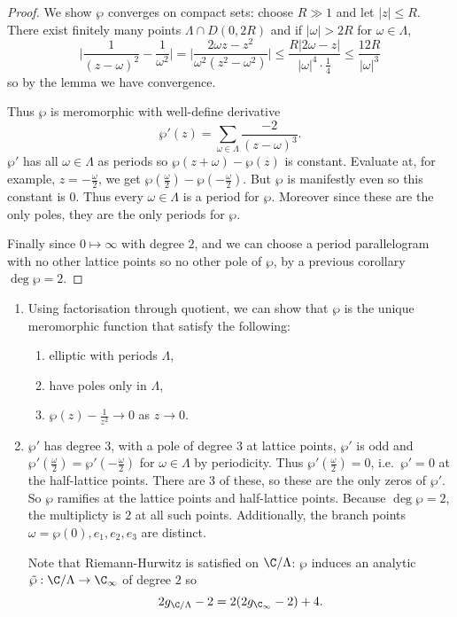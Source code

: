 \documentclass[a4paper]{article}
\begin{document}
\begin{proof}
  We show \(\wp\) converges on compact sets: choose \(R \gg 1\) and let \(|z| \leq R\). There exist finitely many points \(\Lambda \cap D(0, 2R)\) and if \(|\omega| > 2R\) for \(\omega \in \Lambda\),
  \[
    \Bigg| \frac{1}{(z - \omega)^2} - \frac{1}{\omega^2} \Bigg|
    = \Bigg| \frac{2\omega z - z^2}{\omega^2(z^2 - \omega^2)} \Bigg|
    \leq \frac{R |2\omega - z|}{|\omega|^4 \cdot \frac{1}{4}}
    \leq \frac{12R}{|\omega|^3}
  \]
  so by the lemma we have convergence.

  Thus \(\wp\) is meromorphic with well-define derivative
  \[
    \wp'(z) = \sum_{\omega \in \Lambda} \frac{-2}{(z - \omega)^3}.
  \]
  \(\wp'\) has all \(\omega \in \Lambda\) as periods so \(\wp(z + \omega) - \wp(z)\) is constant. Evaluate at, for example, \(z = - \frac{\omega}{2}\), we get \(\wp(\frac{\omega}{2}) - \wp(-\frac{\omega}{2})\). But \(\wp\) is manifestly even so this constant is \(0\). Thus every \(\omega \in \Lambda\) is a period for \(\wp\). Moreover since these are the only poles, they are the only periods for \(\wp\).

  Finally since \(0 \mapsto \infty\) with degree \(2\), and we can choose a period parallelogram with no other lattice points so no other pole of \(\wp\), by a previous corollary \(\deg \wp = 2\).
\end{proof}

\begin{remark}\leavevmode
  \begin{enumerate}
  \item Using factorisation through quotient, we can show that \(\wp\) is the unique meromorphic function that satisfy the following:
    \begin{enumerate}
    \item elliptic with periods \(\Lambda\),
    \item have poles only in \(\Lambda\),
    \item \(\wp(z) - \frac{1}{z^2} \to 0\) as \(z \to 0\).
    \end{enumerate}
  \item \(\wp'\) has degree \(3\), with a pole of degree \(3\) at lattice points, \(\wp'\) is odd and \(\wp'(\frac{\omega}{2}) = \wp'(-\frac{\omega}{2})\) for \(\omega \in \Lambda\) by periodicity. Thus \(\wp'(\frac{\omega}{2}) = 0\), i.e.\ \(\wp' = 0\) at the half-lattice points. There are 3 of these, so these are the only zeros of \(\wp'\). So \(\wp\) ramifies at the lattice points and half-lattice points. Because \(\deg \wp = 2\), the multiplicty is \(2\) at all such points. Additionally, the branch points \(\omega = \wp(0), e_1, e_2, e_3\) are distinct.

    Note that Riemann-Hurwitz is satisfied on \(\C/\Lambda\): \(\wp\) induces an analytic \(\tilde \wp: \C/\Lambda \to \C_\infty\) of degree \(2\) so
    \[
      2g_{\C/\Lambda} - 2 = 2(2 g_{\C_\infty} - 2) + 4.
    \]
  \end{enumerate}
\end{remark}
\end{document}
